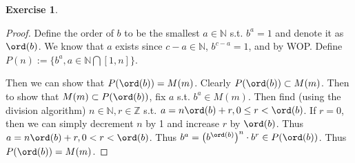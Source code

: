 \documentclass[11pt]{article}
\theoremstyle{definition}
\newtheorem{exercise}{{Exercise}}
\newcommand{\Z}{\mathbb{Z}}
\newcommand{\N}{\mathbb{N}}
\begin{document}
\begin{exercise}
\begin{proof}
		Define the order of $b$ to be the smallest $a\in\N$ s.t. $b^a = 1$ and denote it as $\ord(b)$. We know that $a$ exists since $c-a \in\N$, $b^{c-a} = 1$, and by WOP. Define $P(n) := \{b^a, a\in \N \bigcap [1, n]\}$. 
		
		Then we can show that $P(\ord(b)) = M(m)$. Clearly $P(\ord(b)) \subset M(m)$. Then to show that $M(m) \subset P(\ord(b))$, fix $a$ s.t. $b^a \in M(m)$. Then find (using the division algorithm) $n \in \N, r\in\Z$ s.t. $a = n\ord(b) + r, 0 \le r < \ord(b)$. If $r=0$, then we can simply decrement $n$ by 1 and increase $r$ by $\ord(b)$. Thus $a = n\ord(b) + r, 0<r<\ord(b)$. Thus $b^a = \left(b^{\ord(b)}\right)^n \cdot b^r \in P(\ord(b))$. Thus $P(\ord(b)) = M(m)$.
		
		
	\end{proof}
\end{exercise}
\end{document}
